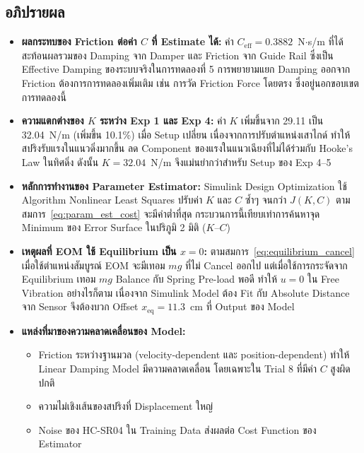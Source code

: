 \subsection{อภิปรายผล}
\begin{itemize}
    \item \textbf{ผลกระทบของ Friction ต่อค่า $C$ ที่ Estimate ได้:}
          ค่า $C_\text{eff} = 0.3882$~N$\cdot$s/m ที่ได้สะท้อนผลรวมของ
          Damping จาก Damper และ Friction จาก Guide Rail
          ซึ่งเป็น Effective Damping ของระบบจริงในการทดลองที่ 5
          การพยายามแยก Damping ออกจาก Friction ต้องการการทดลองเพิ่มเติม
          เช่น การวัด Friction Force โดยตรง ซึ่งอยู่นอกขอบเขตการทดลองนี้

    \item \textbf{ความแตกต่างของ $K$ ระหว่าง Exp 1 และ Exp 4:}
          ค่า $K$ เพิ่มขึ้นจาก 29.11 เป็น 32.04~N/m (เพิ่มขึ้น 10.1\%)
          เมื่อ Setup เปลี่ยน เนื่องจากการปรับตำแหน่งเสาไกด์
          ทำให้สปริงรับแรงในแนวดิ่งมากขึ้น ลด Component
          ของแรงในแนวเฉียงที่ไม่ได้ร่วมกับ Hooke's Law ในทิศดิ่ง
          ดังนั้น $K = 32.04$~N/m จึงแม่นยำกว่าสำหรับ Setup ของ Exp 4--5

    \item \textbf{หลักการทำงานของ Parameter Estimator:}
          Simulink Design Optimization ใช้ Algorithm Nonlinear Least Squares
          ปรับค่า $K$ และ $C$ ซ้ำๆ จนกว่า $J(K,C)$
          ตามสมการ~\eqref{eq:param_est_cost} จะมีค่าต่ำที่สุด
          กระบวนการนี้เทียบเท่าการค้นหาจุด Minimum ของ Error Surface
          ในปริภูมิ 2 มิติ ($K$--$C$)

    \item \textbf{เหตุผลที่ EOM ใช้ Equilibrium เป็น $x = 0$:}
          ตามสมการ~\eqref{eq:equilibrium_cancel} เมื่อใช้ตำแหน่งสัมบูรณ์
          EOM จะมีเทอม $mg$ ที่ไม่ Cancel ออกไป
          แต่เมื่อใช้การกระจัดจาก Equilibrium เทอม $mg$
          Balance กับ Spring Pre-load พอดี ทำให้ $u = 0$
          ใน Free Vibration อย่างไรก็ตาม เนื่องจาก Simulink Model
          ต้อง Fit กับ Absolute Distance จาก Sensor
          จึงต้องบวก Offset $x_\text{eq} = 11.3$~cm
          ที่ Output ของ Model

    \item \textbf{แหล่งที่มาของความคลาดเคลื่อนของ Model:}
          \begin{itemize}
              \item Friction ระหว่างฐานมวล
                    (velocity-dependent และ position-dependent)
                    ทำให้ Linear Damping Model มีความคลาดเคลื่อน
                    โดยเฉพาะใน Trial 8 ที่มีค่า $C$ สูงผิดปกติ
              \item ความไม่เชิงเส้นของสปริงที่ Displacement ใหญ่
              \item Noise ของ HC-SR04 ใน Training Data
                    ส่งผลต่อ Cost Function ของ Estimator
          \end{itemize}


\end{itemize}
